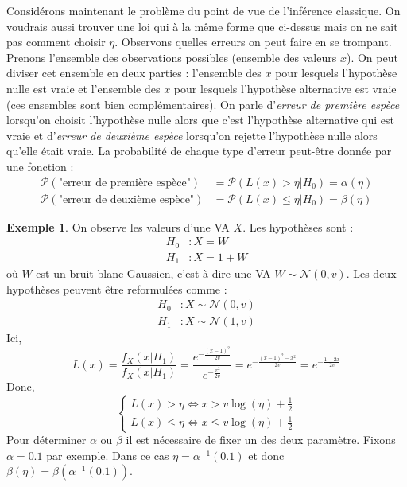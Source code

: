 \documentclass[a4paper,12pt]{report}
\theoremstyle{definition}
\renewcommand{\(}{\left(}
\renewcommand{\)}{\right)}
\renewcommand{\P}{\mathcal{P}}
\renewcommand{\t}{\text}
\renewcommand{\d}{\textit}
\newtheorem{exmp}[thm]{Exemple}
\begin{document}
            Considérons maintenant le problème du point de vue de l'inférence classique. On voudrais aussi trouver une loi qui à la même forme que ci-dessus mais on ne sait pas comment choisir $\eta$. Observons quelles erreurs on peut faire en se trompant. Prenons l'ensemble des observations possibles (ensemble des valeurs $x$). On peut diviser cet ensemble en deux parties : l'ensemble des $x$ pour lesquels l'hypothèse nulle est vraie et l'ensemble des $x$ pour lesquels l'hypothèse alternative est vraie (ces ensembles sont bien complémentaires). On parle d'\d{erreur de première espèce} lorsqu'on choisit l'hypothèse nulle alors que c'est l'hypothèse alternative qui est vraie et d'\d{erreur de deuxième espèce} lorsqu'on rejette l'hypothèse nulle alors qu'elle était vraie. La probabilité de chaque type d'erreur peut-être donnée par une fonction :
            \begin{align*}
                \P(\t{"erreur de première espèce"}) &= \P(L(x)>\eta|H_0) = \alpha(\eta) \\
                \P(\t{"erreur de deuxième espèce"}) &= \P(L(x)\leq\eta|H_0) = \beta(\eta)
            \end{align*}
            
            \begin{exmp}
                On observe les valeurs d'une VA $X$. Les hypothèses sont :
                \begin{align*}
                    H_0 &: X = W \\
                    H_1 &: X = 1+W
                \end{align*}
                où $W$ est un bruit blanc Gaussien, c'est-à-dire une VA $W\sim \mathcal{N}(0,v)$. Les deux hypothèses peuvent être reformulées comme :
                \begin{align*}
                    H_0 &: X \sim \mathcal{N}(0,v) \\
                    H_1 &: X \sim \mathcal{N}(1,v)
                \end{align*}
                Ici, 
                $$L(x) = \frac{f_X(x|H_1)}{f_X(x|H_1)} = \frac{e^{-\frac{(x-1)^2}{2v}}}{e^{-\frac{x^2}{2v}}} = e^{-\frac{(x-1)^2-x^2}{2v}} = e^{-\frac{1-2x}{2v}}$$
                Donc,
                $$\begin{cases}
                L(x) > \eta \Leftrightarrow x > v\log(\eta) + \frac{1}{2}\\
                L(x) \leq \eta \Leftrightarrow x \leq v\log(\eta) + \frac{1}{2}
                \end{cases}$$
                Pour déterminer $\alpha$ ou $\beta$ il est nécessaire de fixer un des deux paramètre. Fixons $\alpha=0.1$ par exemple. Dans ce cas $\eta = \alpha^{-1}(0.1)$ et donc $\beta(\eta) = \beta(\alpha^{-1}(0.1))$.
            \end{exmp}
\end{document}
